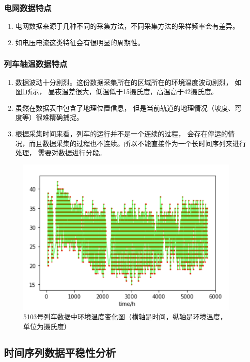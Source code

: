  \subsubsection{电网数据特点}
    \begin{enumerate}
      \item 电网数据来源于几种不同的采集方法，不同采集方法的采样频率会有差异。
      \item 如电压电流这类特征会有很明显的周期性。
    \end{enumerate}
  \subsubsection{列车轴温数据特点}
    \begin{enumerate}
      \item 数据波动十分剧烈。这份数据采集所在的区域所在的环境温度波动剧烈，
      如图\ref{fig:environment temperature change}所示，
      昼夜温差很大，低温低于15摄氏度，高温高于42摄氏度。
      
      \item 虽然在数据表中包含了地理位置信息，
      但是当前轨道的地理情况（坡度、弯度等）很难精确捕捉。
      \item 根据采集时间来看，列车的运行并不是一个连续的过程，
      会存在停运的情况，而且数据采集的过程也不连续。所以不能直接作为一个长时间序列来进行处理，
      需要对数据进行分段。
    \end{enumerate}
    \begin{figure}
      \centering
      \includegraphics[width=0.8\linewidth]{figures/5303evn_tpt.png}
      \caption{5103号列车数据中环境温度变化图（横轴是时间，纵轴是环境温度，单位为摄氏度）}
      \label{fig:environment temperature change}
    \end{figure}

  \subsection{时间序列数据平稳性分析}

